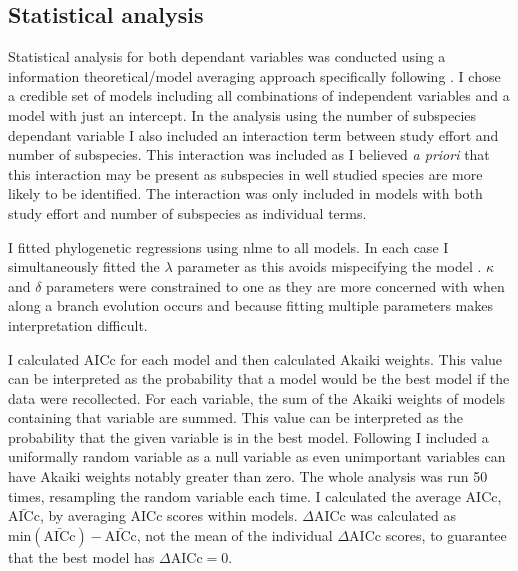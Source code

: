 \subsection{Statistical analysis}

Statistical analysis for both dependant variables was conducted using a information theoretical/model averaging approach \cite{burnham2002model} specifically following \cite{whittingham2005habitat, whittingham2006we}.
I chose a credible set of models including all combinations of independent variables and a model with just an intercept.
In the analysis using the number of subspecies dependant variable I also included an interaction term between study effort and number of subspecies.
This interaction was included as I believed \emph{a priori} that this interaction may be present as subspecies in well studied species are more likely to be identified.
The interaction was only included in models with both study effort and number of subspecies as individual terms.

I fitted phylogenetic regressions using nlme \cite{nlme} to all models.
In each case I simultaneously fitted the $\lambda$ parameter as this avoids mispecifying the model \cite{revell2010phylogenetic}.
$\kappa$ and $\delta$ parameters were constrained to one as they are more concerned with when along a branch evolution occurs and because fitting multiple parameters makes interpretation difficult. 

I calculated AICc for each model and then calculated Akaiki weights.
This value can be interpreted as the probability that a model would be the best model if the data were recollected.
For each variable, the sum of the Akaiki weights of models containing that variable are summed.
This value can be interpreted as the probability that the given variable is in the best model.
Following \cite{whittingham2005habitat} I included a uniformally random variable as a null variable as even unimportant variables can have Akaiki weights notably greater than zero.
The whole analysis was run 50 times, resampling the random variable each time.
I calculated the average AICc, $\bar{\text{AICc}}$, by averaging AICc scores within models.
$\Delta\text{AICc}$ was calculated as $\text{min}(\bar{\text{AICc}}) - \bar{\text{AICc}}$, not the mean of the individual $\Delta\text{AICc}$ scores, to guarantee that the best model has $\Delta\text{AICc} = 0$.



